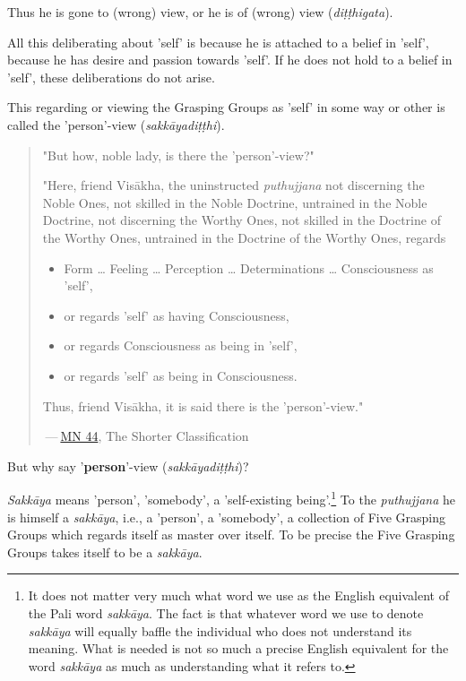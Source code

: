 Thus he is gone to (wrong) view, or he is of (wrong) view (\emph{diṭṭhigata}).

All this deliberating about 'self' is because he is attached to a belief in 'self', because he has desire and passion towards 'self'. If he does not hold to a belief in 'self', these deliberations do not arise.

This regarding or viewing the Grasping Groups as 'self' in some way or other is called the 'person'-view (\emph{sakkāyadiṭṭhi}).

\begin{quote}
"But how, noble lady, is there the 'person'-view?"

"Here, friend Visākha, the uninstructed \emph{puthujjana} not discerning the Noble Ones, not skilled in the Noble Doctrine, untrained in the Noble Doctrine, not discerning the Worthy Ones, not skilled in the Doctrine of the Worthy Ones, untrained in the Doctrine of the Worthy Ones, regards

\begin{itemize}
\item
  Form \ldots{} Feeling \ldots{} Perception \ldots{} Determinations \ldots{} Consciousness as 'self',
\item
  or regards 'self' as having Consciousness,
\item
  or regards Consciousness as being in 'self',
\item
  or regards 'self' as being in Consciousness.
\end{itemize}

Thus, friend Visākha, it is said there is the 'person'-view."

 --- \href{https://suttacentral.net/mn44/en/sujato}{MN 44}, The Shorter Classification
\end{quote}

But why say '\textbf{person}'-view (\emph{sakkāyadiṭṭhi})?

\emph{Sakkāya} means 'person', 'somebody', a 'self-existing being'.\footnote{It does not matter very much what word we use as the English equivalent of the Pali word \emph{sakkāya}. The fact is that whatever word we use to denote \emph{sakkāya} will equally baffle the individual who does not understand its meaning. What is needed is not so much a precise English equivalent for the word \emph{sakkāya} as much as understanding what it refers to.} To the \emph{puthujjana} he is himself a \emph{sakkāya}, i.e., a 'person', a 'somebody', a collection of Five Grasping Groups which regards itself as master over itself. To be precise the Five Grasping Groups takes itself to be a \emph{sakkāya}.


